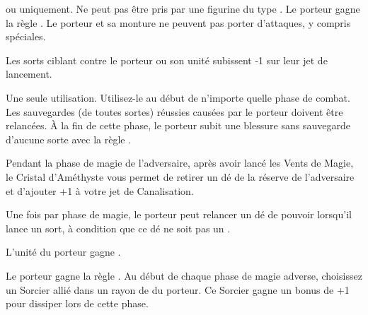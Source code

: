 \endpricelist

\armytalismans

\startpricelist

\archmage ou \mage uniquement. Ne peut pas être pris par une figurine du type \riddenmonster. Le porteur gagne la règle \ethereal. Le porteur et sa monture ne peuvent pas porter d'attaques, y compris spéciales.

\endpricelist

\armyenchanteditems

\startpricelist

Les sorts ciblant contre le porteur ou son unité subissent -{1} sur leur jet de lancement.

Une seule utilisation. Utilisez-le au début de n'importe quelle phase de combat.  Les sauvegardes (de toutes sortes) réussies causées par le porteur doivent être relancées. À la fin de cette phase, le porteur subit une blessure sans sauvegarde d'aucune sorte avec la règle .

\endpricelist

\armyarcaneitems

\startpricelist

Pendant la phase de magie de l'adversaire, après avoir lancé les Vents de Magie, le Cristal d'Améthyste vous permet de retirer un dé de la réserve de l'adversaire et d'ajouter +1 à votre jet de Canalisation.

Une fois par phase de magie, le porteur peut relancer un dé de pouvoir lorsqu'il lance un sort, à condition que ce dé ne soit pas un .

\endpricelist

\armymagicalbanners

\startpricelist

L'unité du porteur gagne \thunderouscharge.

Le porteur gagne la règle \channel. Au début de chaque phase de magie adverse, choisissez un Sorcier allié dans un rayon de  du porteur. Ce Sorcier gagne un bonus de +1 pour dissiper lors de cette phase.

